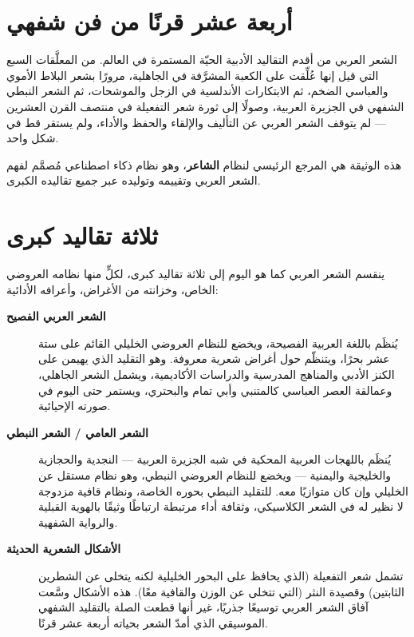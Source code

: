 \begin{otherlanguage}{arabic}

\section*{أربعة عشر قرنًا من فن شفهي}

الشعر العربي من أقدم التقاليد الأدبية الحيّة المستمرة في العالم. من المعلَّقات السبع التي قيل إنها عُلِّقت على الكعبة المشرَّفة في الجاهلية، مرورًا بشعر البلاط الأموي والعباسي الضخم، ثم الابتكارات الأندلسية في الزجل والموشحات، ثم الشعر النبطي الشفهي في الجزيرة العربية، وصولًا إلى ثورة شعر التفعيلة في منتصف القرن العشرين — لم يتوقف الشعر العربي عن التأليف والإلقاء والحفظ والأداء، ولم يستقر قط في شكل واحد.

هذه الوثيقة هي المرجع الرئيسي لنظام \textbf{الشاعر}، وهو نظام ذكاء اصطناعي مُصمَّم لفهم الشعر العربي وتقييمه وتوليده عبر جميع تقاليده الكبرى.

\section*{ثلاثة تقاليد كبرى}

ينقسم الشعر العربي كما هو اليوم إلى ثلاثة تقاليد كبرى، لكلٍّ منها نظامه العروضي الخاص، وخزانته من الأغراض، وأعرافه الأدائية:

\begin{description}
  \item[\textbf{الشعر العربي الفصيح}]
    يُنظَم باللغة العربية الفصيحة، ويخضع للنظام العروضي الخليلي القائم على ستة عشر بحرًا، ويتنظّم حول أغراض شعرية معروفة. وهو التقليد الذي يهيمن على الكنز الأدبي والمناهج المدرسية والدراسات الأكاديمية، ويشمل الشعر الجاهلي، وعمالقة العصر العباسي كالمتنبي وأبي تمام والبحتري، ويستمر حتى اليوم في صورته الإحيائية.

  \item[\textbf{الشعر العامي / الشعر النبطي}]
    يُنظَم باللهجات العربية المحكية في شبه الجزيرة العربية — النجدية والحجازية والخليجية واليمنية — ويخضع للنظام العروضي النبطي، وهو نظام مستقل عن الخليلي وإن كان متوازيًا معه. للتقليد النبطي بحوره الخاصة، ونظام قافية مزدوجة لا نظير له في الشعر الكلاسيكي، وثقافة أداء مرتبطة ارتباطًا وثيقًا بالهوية القبلية والرواية الشفهية.

  \item[\textbf{الأشكال الشعرية الحديثة}]
    تشمل شعر التفعيلة (الذي يحافظ على البحور الخليلية لكنه يتخلى عن الشطرين الثابتين) وقصيدة النثر (التي تتخلى عن الوزن والقافية معًا). هذه الأشكال وسَّعت آفاق الشعر العربي توسيعًا جذريًا، غير أنها قطعت الصلة بالتقليد الشفهي الموسيقي الذي أمدّ الشعر بحياته أربعة عشر قرنًا.
\end{description}


\end{otherlanguage}
